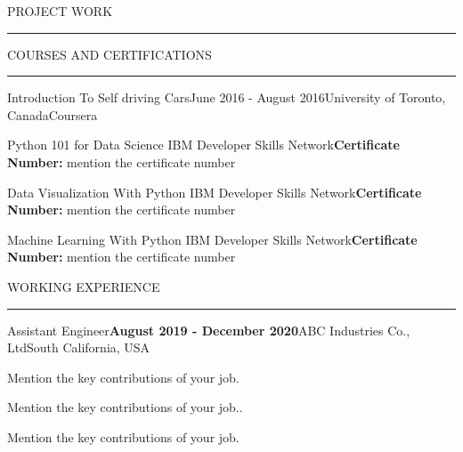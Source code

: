 \documentclass{resume} %
\renewenvironment{rSection}[1]{
\sectionskip
\textcolor{RoyalPurple}{\MakeUppercase{#1}}
\sectionlineskip
\hrule
\begin{list}{}{
\setlength{\leftmargin}{1.5em}
}
\item[]
}{
\end{list}
}
\begin{document}
\begin{rSection}{Project Work}
\begin{rSection}{Courses and Certifications}
\begin{rSubsection}{Introduction To Self driving Cars}{June 2016 - August 2016}{University of Toronto, Canada}{Coursera}\\
\end{rSubsection}

\begin{rSubsection}{Python 101 for Data Science}
{IBM Developer Skills Network}{\textbf{Certificate Number:} mention the certificate number }{}\\
\end{rSubsection}

\begin{rSubsection}{Data Visualization With Python}
{IBM Developer Skills Network}{\textbf{Certificate Number:} mention the certificate number}{}\\
\end{rSubsection}

\begin{rSubsection}{Machine Learning With Python}
{IBM Developer Skills Network}{\textbf{Certificate Number:} mention the certificate number}{}\\
\end{rSubsection}

\end{rSection}





\begin{rSection}{Working Experience}

\begin{rSubsection}{Assistant Engineer}{\textbf{August 2019 - December 2020}}{ABC Industries  Co., Ltd}{South California, USA}
\item Mention the key contributions of your job.

\item Mention the key contributions of your job..

\item Mention the key contributions of your job.
\end{rSubsection}



\end{rSection}
\end{rSection}
\end{document}
